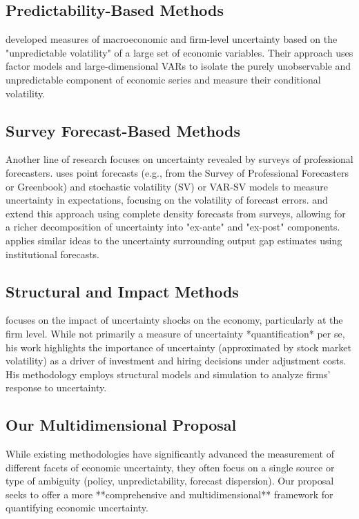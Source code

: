 \documentclass[5p,authoryear]{elsarticle}
\begin{document}
\subsection*{Predictability-Based Methods}
\cite{jurado2015} developed measures of macroeconomic and firm-level uncertainty based on the "unpredictable volatility" of a large set of economic variables. Their approach uses factor models and large-dimensional VARs to isolate the purely unobservable and unpredictable component of economic series and measure their conditional volatility.

\subsection*{Survey Forecast-Based Methods}
Another line of research focuses on uncertainty revealed by surveys of professional forecasters. \cite{clark2017} uses point forecasts (e.g., from the Survey of Professional Forecasters or Greenbook) and stochastic volatility (SV) or VAR-SV models to measure uncertainty in expectations, focusing on the volatility of forecast errors. \cite{carriero2018} and \cite{rossi2016} extend this approach using complete density forecasts from surveys, allowing for a richer decomposition of uncertainty into "ex-ante" and "ex-post" components. \cite{berge2020} applies similar ideas to the uncertainty surrounding output gap estimates using institutional forecasts.

\subsection*{Structural and Impact Methods}
\cite{bloomuncer} focuses on the impact of uncertainty shocks on the economy, particularly at the firm level. While not primarily a measure of uncertainty *quantification* per se, his work highlights the importance of uncertainty (approximated by stock market volatility) as a driver of investment and hiring decisions under adjustment costs. His methodology employs structural models and simulation to analyze firms' response to uncertainty.

\subsection*{Our Multidimensional Proposal}

While existing methodologies have significantly advanced the measurement of different facets of economic uncertainty, they often focus on a single source or type of ambiguity (policy, unpredictability, forecast dispersion). Our proposal seeks to offer a more **comprehensive and multidimensional** framework for quantifying economic uncertainty.
\end{document}
